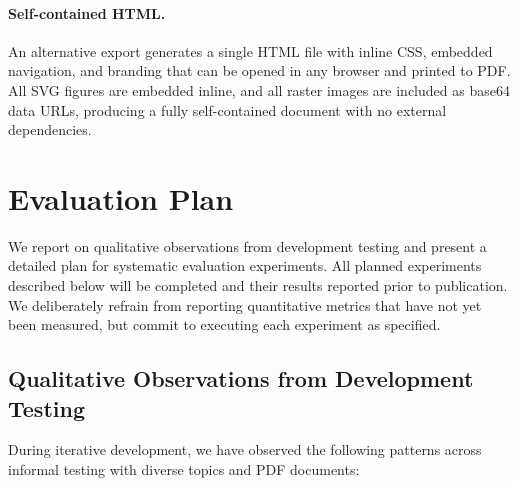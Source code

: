 \documentclass[11pt,a4paper]{article}
\begin{document}
\paragraph{Self-contained HTML.}
An alternative export generates a single HTML file with inline CSS, embedded navigation, and branding that can be opened in any browser and printed to PDF.
All SVG figures are embedded inline, and all raster images are included as base64 data URLs, producing a fully self-contained document with no external dependencies.




\section{Evaluation Plan}
\label{app:evaluation}


We report on qualitative observations from development testing and present a detailed plan for systematic evaluation experiments.
All planned experiments described below will be completed and their results reported prior to publication.
We deliberately refrain from reporting quantitative metrics that have not yet been measured, but commit to executing each experiment as specified.

\subsection{Qualitative Observations from Development Testing}

During iterative development, we have observed the following patterns across informal testing with diverse topics and PDF documents:
\end{document}

